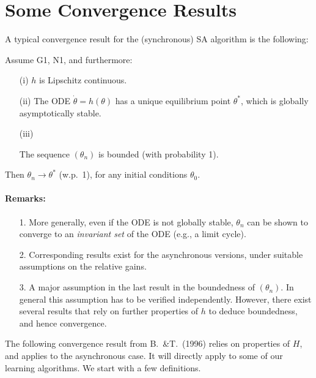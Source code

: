 

\section{Some Convergence Results}

A typical convergence result for the (synchronous) SA algorithm is the following:

\begin{theorem}\label{thm:SA_1}
Assume G1, N1, and furthermore:
\begin{itemize}
\item[(i)]
$h$ is Lipschitz continuous.
\item[(ii)]
The ODE $\dot\theta=h(\theta)$ has a unique equilibrium point $\theta^*$, which
is globally asymptotically stable.
\item[(iii)]

The sequence $(\theta_n)$ is bounded (with probability 1).
\end{itemize}
Then $\theta_n\to\theta^*$ (w.p.~1), for any initial conditions $\theta_0$.
\end{theorem}


\paragraph{Remarks:}
\begin{itemize}
\item[1.]
More generally, even if the ODE is not globally stable, $\theta_n$ can be shown to converge
to an {\em invariant set} of the ODE (e.g., a limit cycle).
\item[2.]
Corresponding results exist for the asynchronous versions, under suitable
assumptions on the relative gains.
\item[3.]
A major assumption in the last result in the boundedness of $(\theta_n)$.
In general this assumption has to be verified independently. However, there
exist several results that rely on further properties of $h$ to deduce
boundedness, and hence convergence.
\end{itemize}


The following convergence result from B.~\&T.~(1996) relies on
  properties of $H$, and applies to the
asynchronous case.
It will directly apply to some of our learning algorithms.
We start with a few definitions.

